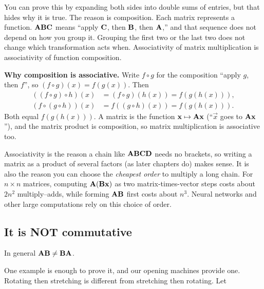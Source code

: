 You can prove this by expanding both sides into double sums of entries, but that
hides why it is true. The reason is composition. Each matrix represents a function.
$\mathbf{A}\mathbf{B}\mathbf{C}$ means ``apply $\mathbf{C}$, then $\mathbf{B}$, then $\mathbf{A}$,'' and that
sequence does not depend on how you group it. Grouping the first two or the last two
does not change which transformation acts when. Associativity of matrix multiplication is
associativity of function composition.

\begin{formalbox}
\textbf{Why composition is associative.} Write $f\circ g$ for the composition ``apply $g$,
then $f$'', so $(f\circ g)(x) = f(g(x))$. Then
\begin{align*}
((f\circ g)\circ h)(x) &= (f\circ g)(h(x)) = f(g(h(x))),\\
(f\circ(g\circ h))(x) &= f((g\circ h)(x)) = f(g(h(x))).
\end{align*}
Both equal $f(g(h(x)))$. A matrix is the function
$\mathbf{x}\mapsto \mathbf{A}\mathbf{x}$ (``$\vec{x}$ goes to $\mathbf{A}\mathbf{x}$''), and the matrix
product is composition, so matrix multiplication is associative too.
\end{formalbox}

\begin{aestheticbox}
Associativity is the reason a chain like $\mathbf{A}\mathbf{B}\mathbf{C}\mathbf{D}$ needs no
brackets, so writing a matrix as a product of several factors (as later chapters do)
makes sense. It is also the reason you can choose the
\emph{cheapest order} to multiply a long chain. For $n\times n$ matrices, computing
$\mathbf{A}(\mathbf{B}\mathbf{x})$ as two matrix-times-vector steps costs about $2n^2$
multiply--adds, while forming $\mathbf{A}\mathbf{B}$ first costs about $n^3$. Neural networks
and other large computations rely on this choice of order.
\end{aestheticbox}

\subsection{It is NOT commutative}

\begin{theorem}
In general $\mathbf{A}\mathbf{B} \ne \mathbf{B}\mathbf{A}$.
\end{theorem}

One example is enough to prove it, and our opening machines provide one. Rotating then
stretching is different from stretching then rotating. Let

